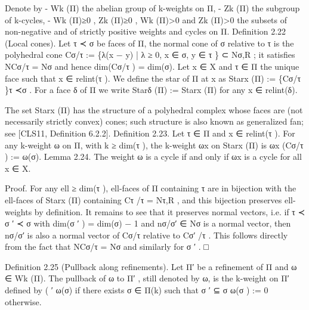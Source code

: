\documentclass[
  11pt,
]{article}
\newenvironment{Shaded}{}{}
\newcommand{\NormalTok}[1]{#1}
\begin{document}
\begin{Shaded}
\begin{Highlighting}[]
\NormalTok{     Denote by}
\NormalTok{       {-} Wk (Π) the abelian group of k{-}weights on Π,}
\NormalTok{       {-} Zk (Π) the subgroup of k{-}cycles,}
\NormalTok{       {-} Wk (Π)≥0 , Zk (Π)≥0 , Wk (Π)\textgreater{}0 and Zk (Π)\textgreater{}0 the subsets of non{-}negative and of strictly}
\NormalTok{         positive weights and cycles on Π.}
\NormalTok{Definition 2.22 (Local cones). Let τ ≺ σ be faces of Π, the normal cone of σ relative to τ is}
\NormalTok{the polyhedral cone}
\NormalTok{                      Cσ/τ := \{λ(x − y) | λ ≥ 0, x ∈ σ, y ∈ τ \} ⊂ Nσ,R ;}
\NormalTok{it satisfies NCσ/τ = Nσ and hence dim(Cσ/τ ) = dim(σ).}
\NormalTok{     Let x ∈ X and τ ∈ Π the unique face such that x ∈ relint(τ ). We define the star of Π at x as}
\NormalTok{                                       Starx (Π) := \{Cσ/τ \}τ ≺σ .}
\NormalTok{For a face δ of Π we write Starδ (Π) := Starx (Π) for any x ∈ relint(δ).}

\NormalTok{   The set Starx (Π) has the structure of a polyhedral complex whose faces are (not necessarily}
\NormalTok{strictly convex) cones; such structure is also known as generalized fan; see [CLS11, Definition}
\NormalTok{6.2.2].}
\NormalTok{Definition 2.23. Let τ ∈ Π and x ∈ relint(τ ). For any k{-}weight ω on Π, with k ≥ dim(τ ), the}
\NormalTok{k{-}weight ωx on Starx (Π) is}
\NormalTok{                                    ωx (Cσ/τ ) := ω(σ).}
\NormalTok{Lemma 2.24. The weight ω is a cycle if and only if ωx is a cycle for all x ∈ X.}

\NormalTok{Proof. For any ell ≥ dim(τ ), ell{-}faces of Π containing τ are in bijection with the ell{-}faces of Starx (Π)}
\NormalTok{containing Cτ /τ = Nτ,R , and this bijection preserves ell{-}weights by definition. It remains to see that}
\NormalTok{it preserves normal vectors, i.e. if τ ≺ σ ′ ≺ σ with dim(σ ′ ) = dim(σ) − 1 and nσ/σ′ ∈ Nσ is a}
\NormalTok{normal vector, then nσ/σ′ is also a normal vector of Cσ/τ relative to Cσ′ /τ . This follows directly}
\NormalTok{from the fact that NCσ/τ = Nσ and similarly for σ ′ .                                               □}

\NormalTok{Definition 2.25 (Pullback along refinements). Let Π′ be a refinement of Π and ω ∈ Wk (Π).}
\NormalTok{The pullback of ω to Π′ , still denoted by ω, is the k{-}weight on Π′ defined by}
\NormalTok{                               (}
\NormalTok{                         ′       ω(σ) if there exists σ ∈ Π(k) such that σ ′ ⊆ σ}
\NormalTok{                    ω(σ ) :=}
\NormalTok{                                 0      otherwise.}


\end{Highlighting}
\end{Shaded}
\end{document}
